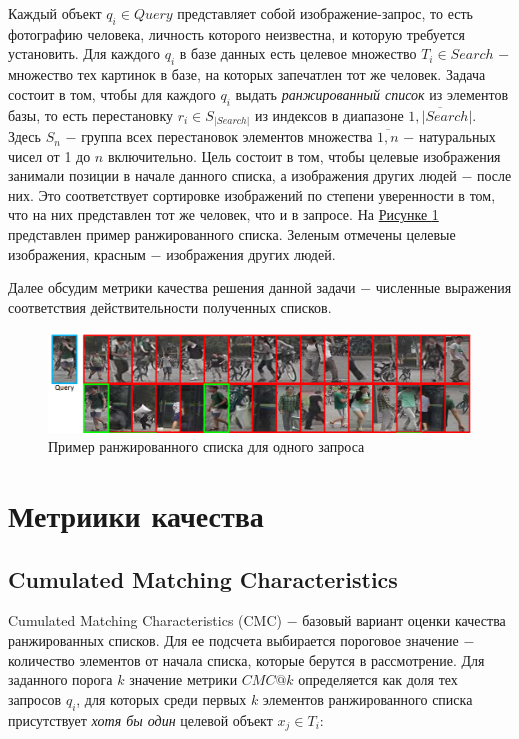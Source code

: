 Каждый объект $q_i \in Query$ представляет собой изображение-запрос, то есть фотографию человека, личность которого неизвестна, и которую требуется установить. Для каждого $q_i$ в базе данных есть целевое множество $T_i \in Search$ $-$ множество тех картинок в базе, на которых запечатлен тот же человек. Задача состоит в том, чтобы для каждого $q_i$ выдать \textit{ранжированный список} из элементов базы, то есть перестановку $r_i \in S_{|Search|}$ из индексов в диапазоне $\overline{1, |Search|}$. Здесь $S_n$ $-$ группа всех перестановок элементов множества $\overline{1, n}$ $-$ натуральных чисел от 1 до $n$ включительно. Цель состоит в том, чтобы целевые изображения занимали позиции в начале данного списка, а изображения других людей $-$ после них. Это соответствует сортировке изображений по степени уверенности в том, что на них представлен тот же человек, что и в запросе. На \hyperref[fig:ranked_list]{Рисунке \ref*{fig:ranked_list}} представлен пример ранжированного списка. Зеленым отмечены целевые изображения, красным $-$ изображения других людей. 

Далее обсудим метрики качества решения данной задачи $-$ численные выражения соответствия действительности полученных списков.

\begin{figure}[ht]
    \centering
    \includegraphics[width=\textwidth]{images/reid_problem/task_ranked_list.png}
    \caption{Пример ранжированного списка для одного запроса \cite{zheng2015scalable}}
    \label{fig:ranked_list}
\end{figure}

\section{Метриики качества}

\subsection{Cumulated Matching Characteristics}

Cumulated Matching Characteristics (CMC) $-$ базовый вариант оценки качества ранжированных списков. Для ее подсчета выбирается пороговое значение $-$ количество элементов от начала списка, которые берутся в рассмотрение. Для заданного порога $k$ значение метрики $CMC @ k$ определяется как доля тех запросов $q_i$, для которых среди первых $k$ элементов ранжированного списка присутствует \textit{хотя бы один} целевой объект $x_j \in T_i$:

